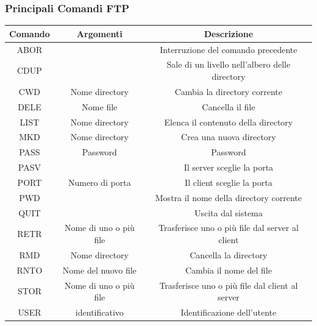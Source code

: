 \documentclass[12pt, letterpaper]{article}
\begin{document}
\subsubsection{Principali Comandi FTP}\begin{center}
    \begin{tabular}{|c|c|c|}
        \hline
        \rowcolor[HTML]{C0C0C0} 
        Comando & Argomenti              & Descrizione                                     \\ \hline
        ABOR    &                        & Interruzione del comando precedente             \\ \hline
        CDUP    &                        & Sale di un livello nell'albero delle directory  \\ \hline
        CWD     & Nome directory         & Cambia la directory corrente                    \\ \hline
        DELE    & Nome file              & Cancella il file                                \\ \hline
        LIST    & Nome directory         & Elenca il contenuto della directory             \\ \hline
        MKD     & Nome directory         & Crea una nuova directory                        \\ \hline
        PASS    & Password               & Password                                        \\ \hline
        PASV    &                        & Il server sceglie la porta                      \\ \hline
        PORT    & Numero di porta        & Il client sceglie la porta                      \\ \hline
        PWD     &                        & Mostra il nome della directory corrente         \\ \hline
        QUIT    &                        & Uscita dal sistema                              \\ \hline
        RETR    & Nome di uno o più file & Trasferisce uno o più file dal server al client \\ \hline
        RMD     & Nome directory         & Cancella la directory                           \\ \hline
        RNTO    & Nome del nuovo file    & Cambia il nome del file                         \\ \hline
        STOR    & Nome di uno o più file & Trasferisce uno o più file dal client al server \\ \hline
        USER    & identificativo         & Identificazione dell'utente                     \\ \hline
        \end{tabular}
\end{center}
\end{document}
